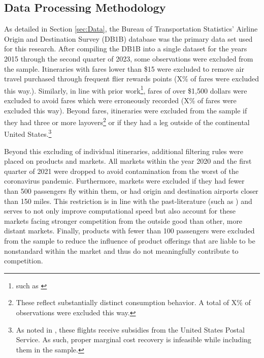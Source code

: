 \documentclass{article}
\begin{document}
	\pagebreak 
	 
	
	\FloatBarrier
	
\pagebreak 
\begin{appendices}
	
	\section{Data Processing Methodology}
	\label{sec:DataProcessing}
	As detailed in Section \ref{sec:Data},	the Bureau of Transportation Statistics' Airline Origin and Destination Survey (DB1B) database was the primary data set used for this research. After compiling the DB1B into a single dataset for the years 2015 through the second quarter of 2023, some observations were excluded from the sample. Itineraries with fares lower than \$15 were excluded to remove air travel purchased through frequent flier rewards points ({X}\% of fares were excluded this way.). Similarly, in line with prior work\footnote{such as \citet{berry_tracing_2010}}, fares of over \$1,500 dollars were excluded to avoid fares which were erroneously recorded (X\% of fares were excluded this way). Beyond fares, itineraries were excluded from the sample if they had three or more layovers\footnote{These reflect substantially distinct consumption behavior. A total of X\% of observations were excluded this way.} or if they had a leg outside of the continental United States.\footnote{As noted in \citet{ciliberto_market_2021}, these flights receive subsidies from the United States Postal Service. As such, proper marginal cost recovery is infeasible while including them in the sample.} 
	
	Beyond this excluding of individual itineraries, additional filtering rules were placed on products and markets. All markets within the year 2020 and the first quarter of 2021 were dropped to avoid contamination from the worst of the coronavirus pandemic. Furthermore, markets were excluded if they had fewer than 500 passengers fly within them, or had origin and destination airports closer than 150 miles. This restriction is in line with the past-literature (such as \citet{ciliberto_does_2014}) and serves to not only improve computational speed but also account for these markets facing stronger competition from the outside good than other, more distant markets. Finally, products with fewer than 100 passengers were excluded from the sample to reduce the influence of product offerings that are liable to be nonstandard within the market and thus do not meaningfully contribute to competition. 
    	

\end{appendices}
\end{document}
